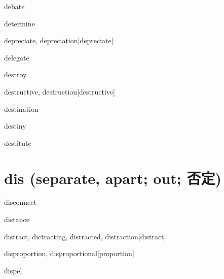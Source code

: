 \begin{RefWord}{debate}
\end{RefWord}

\begin{RefWord}{determine}
\end{RefWord}

\begin{RefWord}{depreciate, depreciation}[depreciate]
\end{RefWord}

\begin{RefWord}{delegate}
\end{RefWord}

\begin{RefWord}{destroy}
\end{RefWord}

\begin{RefWord}{destructive, destruction}[destructive]
\end{RefWord}

\begin{RefWord}{destination}
\end{RefWord}

\begin{RefWord}{destiny}
\end{RefWord}

\begin{RefWord}{destitute}
\end{RefWord}

\section{dis (separate, apart; out; 否定)}

\begin{RefWord}{disconnect}
\end{RefWord}

\begin{RefWord}{distance}
\end{RefWord}

\begin{RefWord}{distract, dictracting, distracted, distraction}[distract]
\end{RefWord}

\begin{RefWord}{disproportion, disproportional}[proportion]
\end{RefWord}

\begin{RefWord}{dispel}
\end{RefWord}

